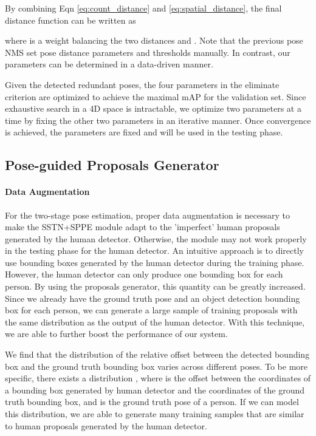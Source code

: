 \documentclass[10pt,twocolumn,letterpaper]{article}
\begin{document}
By combining Eqn \eqref{eq:count_distance} and \eqref{eq:spatial_distance}, the final distance function can be written as

where  is a weight balancing the two distances and . Note that the previous pose NMS \cite{chen2015parsing} set pose distance parameters and thresholds manually. In contrast, our parameters can be determined in a data-driven manner.

\vspace{2mm}
 Given the detected redundant poses, the four parameters in the eliminate criterion  are optimized to achieve the maximal mAP for the validation set. Since exhaustive search in a 4D space is intractable, we optimize two parameters at a time by fixing the other two parameters in an iterative manner. Once convergence is achieved, the parameters are fixed and will be used in the testing phase.


\subsection{Pose-guided Proposals Generator}
\paragraph{Data Augmentation} For the two-stage pose estimation, proper data augmentation is necessary to make the SSTN+SPPE module adapt to the 'imperfect' human proposals generated by the human detector. Otherwise, the module may not work properly in the testing phase for the human detector. An intuitive approach is to directly use bounding boxes generated by the human detector during the training phase. However, the human detector can only produce one bounding box for each person. By using the proposals generator, this quantity can be greatly increased. Since we already have the ground truth pose and an object detection bounding box for each person, we can generate a large sample of training proposals with the same distribution as the output of the human detector. With this technique, we are able to further boost the performance of our system.

\vspace{2mm}
 We find that the distribution of the relative offset between the detected bounding box and the ground truth bounding box varies across different poses. To be more specific, there exists a distribution , where  is the offset between the coordinates of a bounding box generated by human detector and the coordinates of the ground truth bounding box, and  is the ground truth pose of a person. If we can model this distribution, we are able to generate many training samples that are  similar to human proposals generated by the human detector.
\end{document}
